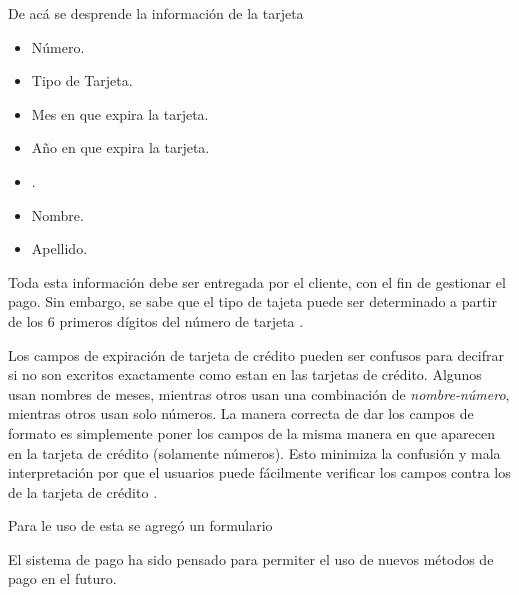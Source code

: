 De acá se desprende la información de la tarjeta

\begin{itemize}
	\item Número.
	\item Tipo de Tarjeta.
	\item Mes en que expira la tarjeta.
	\item Año en que expira la tarjeta.
	\item \cvvTWOCOM.
	\item Nombre.
	\item Apellido.
\end{itemize} 

Toda esta información debe ser entregada por el cliente, con el fin de gestionar el pago. Sin embargo, se sabe que el tipo de tajeta puede ser determinado a partir de los 6 primeros dígitos del número de tarjeta \cite{online_investopedia_meaning_IIN}. 

Los campos de expiración de tarjeta de crédito pueden ser confusos para decifrar si no son excritos exactamente como estan en las tarjetas de crédito. Algunos \websitesINT usan nombres de meses, mientras otros usan una combinación de \textit{nombre-número}, mientras otros usan solo números. La manera correcta de dar los campos de formato es simplemente poner los campos de la misma manera en que aparecen en la tarjeta de crédito (solamente números). Esto minimiza la confusión y mala interpretación por que el usuarios puede fácilmente verificar  los campos contra los de la tarjeta de crédito \cite{online_official_smashingmagazine_fundamental_guidelines_checkout_design}.



Para le uso de esta \apiAS se agregó un formulario 


El sistema de pago ha sido pensado para permiter el uso de nuevos métodos de pago en el futuro.
